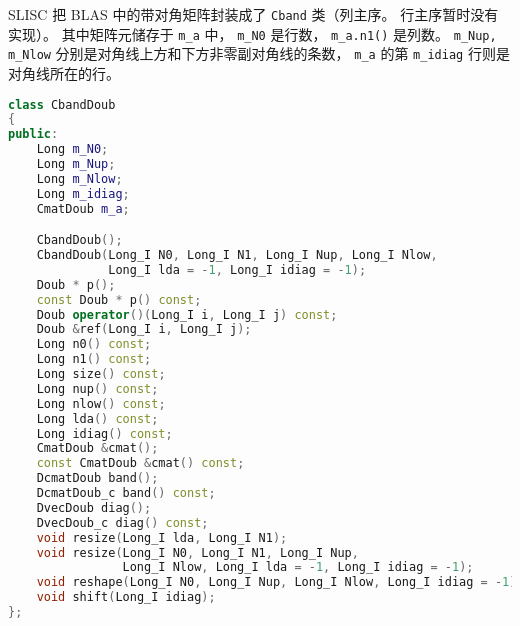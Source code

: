 
\begin{issues}
\issueDraft
\end{issues}


SLISC 把 BLAS 中的带对角矩阵封装成了 \verb|Cband| 类（列主序。 行主序暂时没有实现）。 其中矩阵元储存于 \verb|m_a| 中， \verb|m_N0| 是行数， \verb|m_a.n1()| 是列数。 \verb|m_Nup, m_Nlow| 分别是对角线上方和下方非零副对角线的条数， \verb|m_a| 的第 \verb|m_idiag| 行则是对角线所在的行。
\begin{lstlisting}[language=cpp]
class CbandDoub
{
public:
    Long m_N0;
    Long m_Nup;
    Long m_Nlow;
    Long m_idiag;
    CmatDoub m_a;

    CbandDoub();
    CbandDoub(Long_I N0, Long_I N1, Long_I Nup, Long_I Nlow,
              Long_I lda = -1, Long_I idiag = -1);
    Doub * p();
    const Doub * p() const;
    Doub operator()(Long_I i, Long_I j) const;
    Doub &ref(Long_I i, Long_I j);
    Long n0() const;
    Long n1() const;
    Long size() const;
    Long nup() const;
    Long nlow() const;
    Long lda() const;
    Long idiag() const;
    CmatDoub &cmat();
    const CmatDoub &cmat() const;
    DcmatDoub band();
    DcmatDoub_c band() const;
    DvecDoub diag();
    DvecDoub_c diag() const;
    void resize(Long_I lda, Long_I N1);
    void resize(Long_I N0, Long_I N1, Long_I Nup,
                Long_I Nlow, Long_I lda = -1, Long_I idiag = -1);
    void reshape(Long_I N0, Long_I Nup, Long_I Nlow, Long_I idiag = -1);
    void shift(Long_I idiag);
};
\end{lstlisting}
